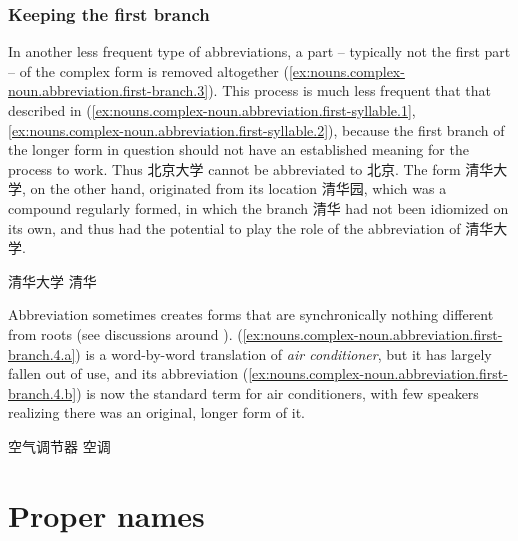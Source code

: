 \documentclass[UTF8, a4paper, oneside, scheme=plain, 12pt]{ctexrep}
\newcommand{\form}[1]{\emph{#1}}
\begin{document}
\subsubsection{Keeping the first branch}

In another less frequent type of abbreviations,
a part -- typically not the first part -- of the complex form is removed altogether
(\ref{ex:nouns.complex-noun.abbreviation.first-branch.3}). 
This process is much less frequent that that described in (\ref{ex:nouns.complex-noun.abbreviation.first-syllable.1}, \ref{ex:nouns.complex-noun.abbreviation.first-syllable.2}),
because the first branch of the longer form in question
should not have an established meaning for the process to work.
Thus 北京大学 cannot be abbreviated to 北京.
The form 清华大学, on the other hand, originated from its location 清华园,
which was a compound regularly formed,
in which the branch 清华 had not been idiomized on its own,
and thus had the potential to play the role of the abbreviation of 清华大学.

\begin{exe}
    \ex\label{ex:nouns.complex-noun.abbreviation.first-branch.3}
    \begin{xlist}
        \ex 清华大学
        \ex 清华
    \end{xlist}
\end{exe}

Abbreviation sometimes creates forms that are synchronically nothing different from roots
(see discussions around ).
(\ref{ex:nouns.complex-noun.abbreviation.first-branch.4.a}) is a word-by-word translation of 
\form{air conditioner},
but it has largely fallen out of use,
and its abbreviation (\ref{ex:nouns.complex-noun.abbreviation.first-branch.4.b})
is now the standard term for air conditioners,
with few speakers realizing there was an original, longer form of it.

\begin{exe}
    \ex\label{ex:nouns.complex-noun.abbreviation.first-branch.4}
    \begin{xlist}
        \ex\label{ex:nouns.complex-noun.abbreviation.first-branch.4.a} 空气调节器
        \ex\label{ex:nouns.complex-noun.abbreviation.first-branch.4.b} 空调
    \end{xlist}
\end{exe}

\section{Proper names}
\end{document}
